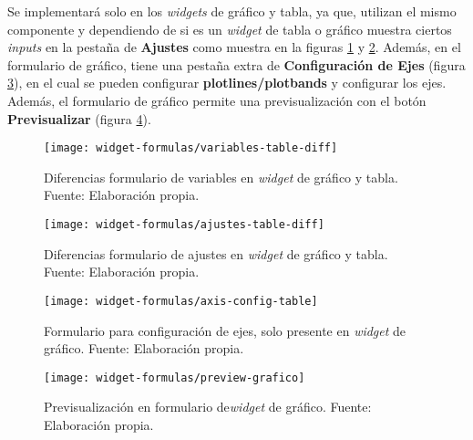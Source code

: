 Se implementará solo en los \textit{widgets} de gráfico y tabla, ya que, utilizan el mismo componente y dependiendo de si es un \textit{widget} de tabla o gráfico muestra ciertos \textit{inputs} en la pestaña de \textbf{Ajustes} como muestra en la figuras \ref{fig:variables-table-diff} y \ref{fig:ajustes-table-diff}. Además, en el formulario de gráfico, tiene una pestaña extra de \textbf{Configuración de Ejes} (figura \ref{fig:axis-config-table}), en el cual se pueden configurar \textbf{plotlines/plotbands} y configurar los ejes. Además, el formulario de gráfico permite una previsualización con el botón \textbf{Previsualizar} (figura \ref{fig:preview-grafico}).

\begin{figure}[H]
	\centering
	\texttt{[image: widget-formulas/variables-table-diff]}
	\caption{\label{fig:variables-table-diff} Diferencias formulario de variables en \textit{widget} de gráfico y tabla. Fuente: Elaboración propia.}
\end{figure}
\begin{figure}[H]
	\centering
	\texttt{[image: widget-formulas/ajustes-table-diff]}
	\caption{\label{fig:ajustes-table-diff} Diferencias formulario de ajustes en \textit{widget} de gráfico y tabla. Fuente: Elaboración propia.}
\end{figure}
\begin{figure}[H]
	\centering
	\texttt{[image: widget-formulas/axis-config-table]}
	\caption{\label{fig:axis-config-table} Formulario para configuración de ejes, solo presente en \textit{widget} de gráfico. Fuente: Elaboración propia.}
\end{figure}
\begin{figure}[H]
	\centering
	\texttt{[image: widget-formulas/preview-grafico]}
	\caption{\label{fig:preview-grafico} Previsualización en formulario de\textit{widget} de gráfico. Fuente: Elaboración propia.}
\end{figure}


